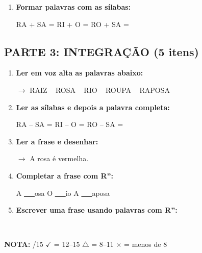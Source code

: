 \begin{exercicio}
\begin{enumerate}[resume]
  \item \textbf{Formar palavras com as sílabas:}
  \begin{center}
  RA + SA = \underline{\hspace{2cm}} \quad RI + O = \underline{\hspace{2cm}} \quad RO + SA = \underline{\hspace{2cm}}
  \end{center}
\end{enumerate}

\subsection*{PARTE 3: INTEGRAÇÃO (5 itens)}

\begin{enumerate}[resume]
  \item \textbf{Ler em voz alta as palavras abaixo:}
  \begin{center}
  $\rightarrow$ RAIZ  ~  ROSA  ~  RIO  ~  ROUPA  ~  RAPOSA
  \end{center}

  \item \textbf{Ler as sílabas e depois a palavra completa:}
  \begin{center}
  RA -- SA = \underline{\hspace{2cm}} \quad RI -- O = \underline{\hspace{2cm}} \quad RO -- SA = \underline{\hspace{2cm}}
  \end{center}

  \item \textbf{Ler a frase e desenhar:}
  \begin{center}
  $\rightarrow$ A rosa é vermelha.
  \end{center}
  \begin{center}
  \end{center}

  \item \textbf{Completar a frase com R'':}
  \begin{center}
  A \underline{~~~}osa \quad O \underline{~~~}io \quad A \underline{~~~}aposa
  \end{center}

  \item \textbf{Escrever uma frase usando palavras com R'':}
  \begin{center}
  \underline{\hspace{12cm}} \\
  \underline{\hspace{12cm}}
  \end{center}
\end{enumerate}

\noindent\textbf{NOTA:} \underline{\hspace{1cm}}/15 \quad $\checkmark$ = 12--15 \quad $\triangle$ = 8--11 \quad $\times$ = menos de 8
\end{exercicio}

